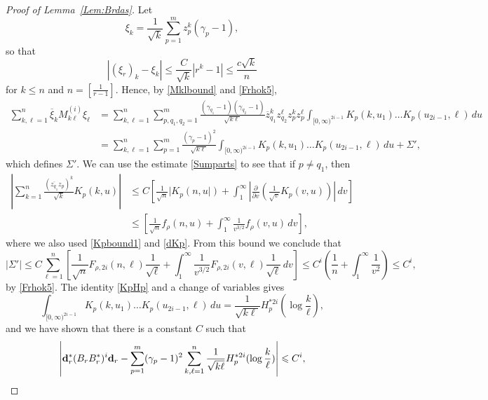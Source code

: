 \documentclass{article}
\numberwithin{equation}{section}
\numberwithin{figure}{section}
\theoremstyle{plain}
\theoremstyle{plain}
\numberwithin{thm}{section}
\theoremstyle{remark}
\let \le \leqslant
\begin{document}
\begin{proof}[Proof of Lemma~\ref{Lem:Brdas}]
Let 
\begin{equation*}
    \xi_k=\frac 1{\sqrt{k}}\sum_{p=1}^m z_p^k(\gamma_p-1),
\end{equation*}
so that
\begin{equation*}
    |(\xi_r)_k-\xi_k|\le\frac{C}{\sqrt{k}}|r^k-1|\le \frac{c\sqrt{k}}{n}
\end{equation*}
for $k\le n$ and $n=[\frac{1}{r-1}]$. Hence, by \eqref{Mklbound} and \eqref{Frhok5},
\begin{align*}
 \sum_{k,\ell=1}^n\overline{\xi}_kM^{(i)}_{k\ell}\xi_\ell &=
 \sum_{k,\ell=1}^n\sum_{p,q_1,q_2=1}^m\frac{(\gamma_{q_1}-1)(\gamma_{q_2}-1)}{\sqrt{k\ell}}\overline{z}_{q_1}^k z_{q_2}^\ell z_p^k z_p^\ell\int_{[0,\infty)^{2i-1}}K_p(k,u_1)\dots K_p(u_{2i-1},\ell)\,du\\
 &=\sum_{k,\ell=1}^n\sum_{p=1}^m\frac{(\gamma_p-1)^2}{\sqrt{k\ell}}\int_{[0,\infty)^{2i-1}}K_p(k,u_1)\dots K_p(u_{2i-1},\ell)\,du+\Sigma',
\end{align*}
which defines $\Sigma'$.
We can use the estimate \eqref{Sumparts} to see that if $p\neq q_1$, then
\begin{align*}
    \left|\sum_{k=1}^n\frac{(\overline{z_{q_1}}z_p)^k}{\sqrt{k}}K_p(k,u)\right|&\le C\left[\frac 1{\sqrt{n}}|K_p(n,u|)+\int_1^\infty\left|\frac{\partial}{\partial v}\left(\frac 1{\sqrt{v}}K_p(v,u)\right)\right|\,dv\right]\\
    &\le\left[\frac 1{\sqrt{n}}f_\rho(n,u)+\int_1^\infty\frac 1{v^{3/2} }f_\rho(v,u)\,dv\right],
\end{align*}
where we also used \eqref{Kpbound1} and \eqref{dKp}. 
From this bound we conclude that
\begin{equation}
    |\Sigma'|\le C\sum_{\ell=1}^n\left[\frac 1{\sqrt{n}}F_{\rho,2i}(n,\ell)\frac 1{\sqrt{\ell}}+\int_1^\infty\frac 1{v^{3/2}}F_{\rho,2i}(v,\ell)\frac 1{\sqrt{\ell}}\,dv\right]
    \le C^i(\frac 1n+\int_1^\infty\frac 1{v^{2}})\le C^i,
\end{equation}
by \eqref{Frhok5}. The identity \eqref{KpHp} and a change of variables gives
\begin{equation*}
 \int_{[0,\infty)^{2i-1}}K_p(k,u_1)\dots K_p(u_{2i-1},\ell)\,du=\frac 1{\sqrt{k\ell}}H_p^{*2i}(\log\frac k\ell),   
\end{equation*}
and we have shown that there is a constant $C$ such that
\begin{equation*}
    \left|{\bf d}_r^*(B_rB_r^*)^i{\bf d}_r-\sum_{p=1}^m(\gamma_p-1)^2\sum_{k,\ell=1}^n\frac 1{\sqrt{k\ell}}H_p^{*2i}(\log\frac k\ell)\right|\le C^i,
\end{equation*}

\end{proof}
\end{document}
